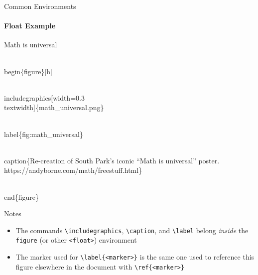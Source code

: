 \documentclass{beamer}
\begin{document}
\begin{frame}{Common Environments}
\framesubtitle{Float Example}
	\begin{exampleblock}{Math is universal}
		\begin{semiverbatim}
			\\begin\{figure\}[h]
			
			\\includegraphics[width=0.3\\textwidth]\{math\_universal.png\}
			
			\\label\{fig:math\_universal\}
			
			\\caption\{Re-creation of South Park's iconic ``Math is universal'' poster. https://andyborne.com/math/freestuff.html\}

			\\end\{figure\}
		\end{semiverbatim}
	\end{exampleblock}
	\begin{alertblock}{Notes}
		\begin{itemize}
			\item The commands \texttt{\textbackslash includegraphics}, \texttt{\textbackslash caption}, and \texttt{\textbackslash label} belong \emph{inside} the \texttt{figure} (or other \texttt{<float>}) environment
			\item The marker used for \texttt{\textbackslash label\{<marker>\}} is the same one used to reference this figure elsewhere in the document with \texttt{\textbackslash ref\{<marker>\}}
		\end{itemize}
	\end{alertblock}
\end{frame}
\end{document}
